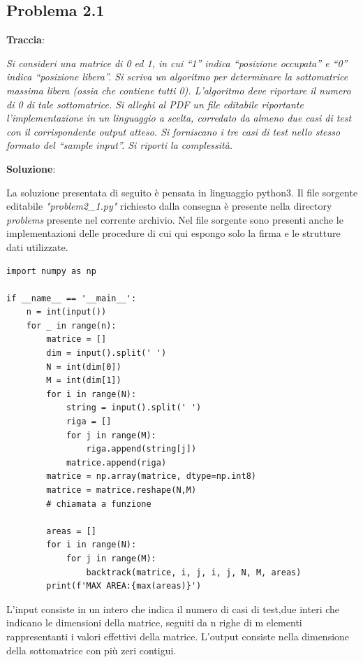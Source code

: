 \documentclass{article}
\begin{document}
\subsection{Problema 2.1} \label{subsec:problema_2_1}
\textbf{Traccia}:

\noindent
\textit{Si consideri una matrice di 0 ed 1, in cui “1” indica “posizione occupata” e “0” indica “posizione libera”. Si scriva un algoritmo per determinare la sottomatrice massima libera (ossia che contiene tutti 0). L'algoritmo deve riportare il numero di 0 di tale sottomatrice.
Si alleghi al PDF un file editabile riportante l'implementazione in un linguaggio a scelta, corredato da almeno due casi di test con il corrispondente output atteso. Si forniscano i tre casi di test nello stesso formato del “sample input”. Si riporti la complessità.
}

\vspace{2\baselineskip}
\noindent
\textbf{Soluzione}: 

\noindent
La soluzione presentata di seguito è pensata in linguaggio python3. Il file sorgente editabile \textit{"problem2\_1.py"} richiesto dalla consegna è presente nella directory \textit{problems} presente nel corrente archivio. Nel file sorgente sono presenti anche le implementazioni delle procedure di cui qui espongo solo la firma e le strutture dati utilizzate.

\begin{lstlisting}[language=Python3]
import numpy as np 

if __name__ == '__main__':
    n = int(input())
    for _ in range(n):
        matrice = []
        dim = input().split(' ')
        N = int(dim[0])
        M = int(dim[1])
        for i in range(N):
            string = input().split(' ')
            riga = []
            for j in range(M):
                riga.append(string[j])
            matrice.append(riga)
        matrice = np.array(matrice, dtype=np.int8)
        matrice = matrice.reshape(N,M)
        # chiamata a funzione

        areas = []
        for i in range(N):
            for j in range(M):
                backtrack(matrice, i, j, i, j, N, M, areas)
        print(f'MAX AREA:{max(areas)}')

\end{lstlisting}
\noindent
L'input  consiste in un intero che indica il numero di casi di test,due interi che indicano le dimensioni della matrice, seguiti da n righe di m elementi rappresentanti i valori effettivi della matrice. L'output consiste nella dimensione della sottomatrice con più zeri contigui. 
\end{document}

